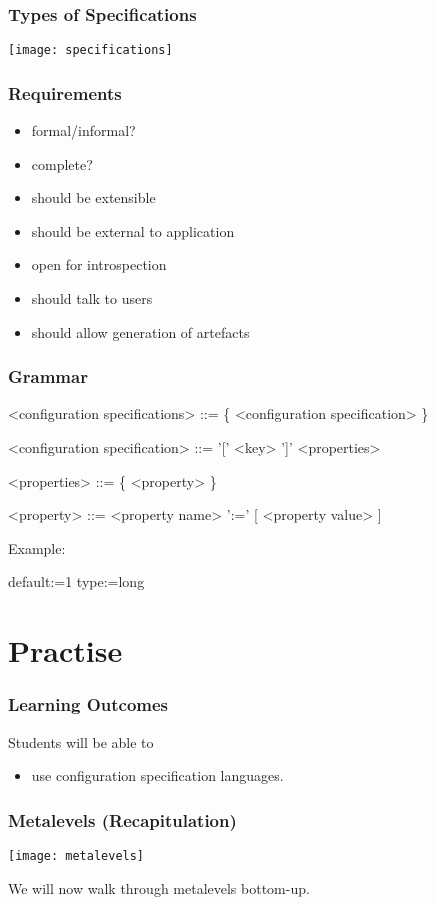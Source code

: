 \begin{frame}
	\frametitle{Types of Specifications}
	\texttt{[image: specifications]}
\end{frame}


\begin{frame}
	\frametitle{Requirements}

	\begin{itemize}
	\item formal/informal?
	\item complete?
	\pause
	\item should be extensible
	\item should be external to application
	\item open for introspection
	\item should talk to users
	\item should allow generation of artefacts
	\end{itemize}
\end{frame}


\begin{frame}[fragile]
	\frametitle{Grammar}
	\begin{grammar}
	<configuration specifications> ::= \{ <configuration specification> \}

	<configuration specification> ::= '[' <key> ']' <properties>

	<properties> ::= \{ <property> \}

	<property> ::= <property name> ':=' [ <property value> ]
	\end{grammar}

	\vspace{1cm}
	Example:
	\begin{code}
	default:=1
	type:=long
	\end{code}
\end{frame}


\section{Practise}

\begin{frame}
	\frametitle{Learning Outcomes}
	Students will be able to
	\begin{itemize}
	\item use configuration specification languages.
	\end{itemize}
\end{frame}

\begin{frame}
	\frametitle{Metalevels (Recapitulation)}
	\texttt{[image: metalevels]}

	We will now walk through metalevels bottom-up.
\end{frame}

